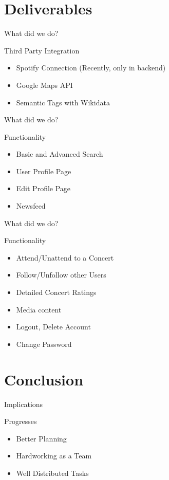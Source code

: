 \documentclass{beamer}
\begin{document}
\section{Deliverables}

\begin{frame}{What did we do?}
	\begin{block}{Third Party Integration}
		\begin{itemize}
			\item[\Checkmark] Spotify Connection (Recently, only in backend)
			\item[\Checkmark] Google Maps API
			\item[\Checkmark] Semantic Tags with Wikidata	
		\end{itemize}
	\end{block}
\end{frame}

\begin{frame}{What did we do?}
	\begin{block}{Functionality}
		\begin{itemize}
			\item[\Checkmark] 	Basic and Advanced Search
			\item[\Checkmark] 	User Profile Page
			\item[\XSolidBrush] Edit Profile Page
			\item[\Checkmark] 	Newsfeed
		\end{itemize}
	\end{block}
\end{frame}

\begin{frame}{What did we do?}
	\begin{block}{Functionality}
		\begin{itemize}
			\item[\Checkmark] Attend/Unattend to a Concert
			\item[\Checkmark] Follow/Unfollow other Users
			\item[\Checkmark] Detailed Concert Ratings
			\item[\Checkmark] Media content
			\item[\Checkmark] Logout, Delete Account
			\item[\XSolidBrush] Change Password
		\end{itemize}
	\end{block}
\end{frame}

\section{Conclusion}
\begin{frame}{Implications}
		\begin{block}{Progresses}
			\begin{itemize}
				\item Better Planning
				\item Hardworking as a Team
				\item Well Distributed Tasks
			\end{itemize}
		\end{block}
		
\end{frame}
\end{document}
